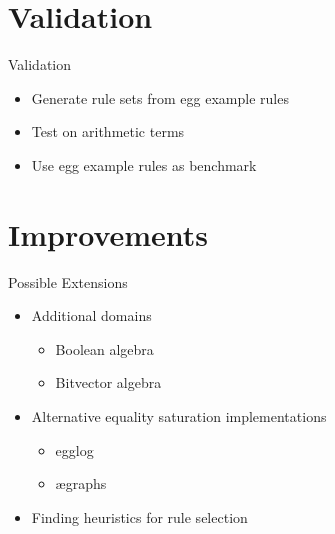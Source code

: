 \documentclass[14pt, aspectratio=169]{beamer}
\begin{document}
	\section{Validation}
	\begin{frame}{Validation}
		\begin{itemize}
			\item Generate rule sets from egg example rules 
			\item Test on arithmetic terms
			\item Use egg example rules as benchmark
		\end{itemize}
	\end{frame}
	\section{Improvements}
	\begin{frame}{Possible Extensions}
		\begin{itemize}
			\item Additional domains
			\begin{itemize}
				\item Boolean algebra
				\item Bitvector algebra
			\end{itemize}
			\item Alternative equality saturation implementations
			\begin{itemize}
				\item egglog
				\item ægraphs
			\end{itemize}
			\item Finding heuristics for rule selection
		\end{itemize}
	\end{frame}
\end{document}
